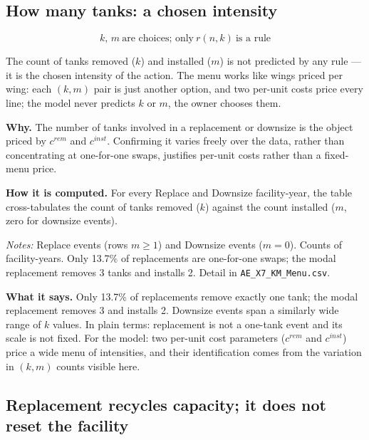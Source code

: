 \documentclass[
  letterpaper,
  DIV=11,
  numbers=noendperiod]{scrartcl}
\begin{document}
\subsection{How many tanks: a chosen intensity}\label{sec-ae-x7b}

\[
k,\, m\ \text{are choices; only}\ r(n,k)\ \text{is a rule}
\]

The count of tanks removed (\(k\)) and installed (\(m\)) is not
predicted by any rule --- it is the chosen intensity of the action. The
menu works like wings priced per wing: each \((k,m)\) pair is just
another option, and two per-unit costs price every line; the model never
predicts \(k\) or \(m\), the owner chooses them.

\textbf{Why.} The number of tanks involved in a replacement or downsize
is the object priced by \(c^{rem}\) and \(c^{inst}\). Confirming it
varies freely over the data, rather than concentrating at one-for-one
swaps, justifies per-unit costs rather than a fixed-menu price.

\textbf{How it is computed.} For every Replace and Downsize
facility-year, the table cross-tabulates the count of tanks removed
(\(k\)) against the count installed (\(m\), zero for downsize events).

\begin{table}[H]
\centering
\caption{$(k,m)$ cross-tabulation: tanks removed and installed per event}

\par\vspace{4pt}
{\footnotesize\textit{Notes:} Replace events (rows $m \ge 1$) and Downsize
events ($m = 0$). Counts of facility-years. Only 13.7\% of replacements are
one-for-one swaps; the modal replacement removes 3 tanks and installs 2. Detail
in \texttt{AE\_X7\_KM\_Menu.csv}.\par}
\end{table}

\textbf{What it says.} Only 13.7\% of replacements remove exactly one
tank; the modal replacement removes 3 and installs 2. Downsize events
span a similarly wide range of \(k\) values. In plain terms: replacement
is not a one-tank event and its scale is not fixed. For the model: two
per-unit cost parameters (\(c^{rem}\) and \(c^{inst}\)) price a wide
menu of intensities, and their identification comes from the variation
in \((k,m)\) counts visible here.

\subsection{Replacement recycles capacity; it does not reset the
facility}\label{sec-ae-x8}
\end{document}
